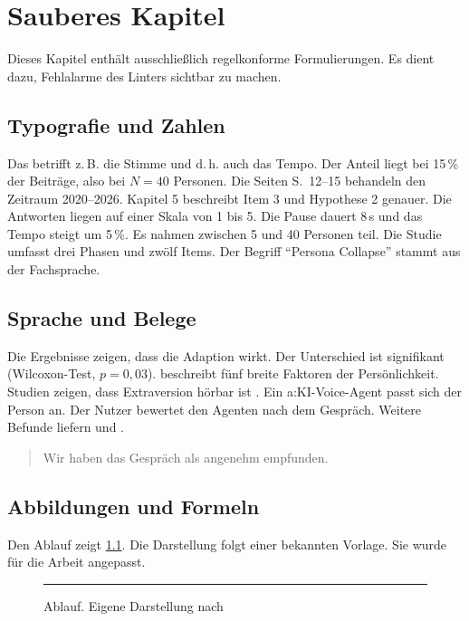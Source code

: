 \chapter{Sauberes Kapitel}
\label{chap:sauber}

Dieses Kapitel enthält ausschließlich regelkonforme Formulierungen.
Es dient dazu, Fehlalarme des Linters sichtbar zu machen.

\section{Typografie und Zahlen}
\label{sec:sauber_typo}

Das betrifft z.\,B. die Stimme und d.\,h. auch das Tempo.
Der Anteil liegt bei 15\,\% der Beiträge, also bei $N = 40$ Personen.
Die Seiten S.~12--15 behandeln den Zeitraum 2020--2026.
Kapitel 5 beschreibt Item 3 und Hypothese 2 genauer.
Die Antworten liegen auf einer Skala von 1 bis 5.
Die Pause dauert 8\,s und das Tempo steigt um 5\,\%.
Es nahmen zwischen 5 und 40 Personen teil.
Die Studie umfasst drei Phasen und zwölf Items.
Der Begriff \enquote{Persona Collapse} stammt aus der Fachsprache.

\section{Sprache und Belege}
\label{sec:sauber_sprache}

Die Ergebnisse zeigen, dass die Adaption wirkt.
Der Unterschied ist signifikant (Wilcoxon-Test, $p = 0{,}03$).
\textcite{goldberg1990} beschreibt fünf breite Faktoren der Persönlichkeit.
Studien zeigen, dass Extraversion hörbar ist \parencite{goldberg1990}.
Ein \gls{a:KI}-Voice-Agent passt sich der Person an.
Der Nutzer bewertet den Agenten nach dem Gespräch.
Weitere Befunde liefern \textcite{ohnedoi2021} und \textcite{preprint2025}.

\begin{quote}
Wir haben das Gespräch als angenehm empfunden.
\end{quote}

\section{Abbildungen und Formeln}
\label{sec:sauber_abb}

Den Ablauf zeigt \cref{fig:sauber}.
Die Darstellung folgt einer bekannten Vorlage.
Sie wurde für die Arbeit angepasst.

\begin{figure}[htbp]
    \centering
    \rule{2cm}{1cm}
    \caption{Ablauf. Eigene Darstellung nach \textcite{goldberg1990}}
    \label{fig:sauber}
\end{figure}


